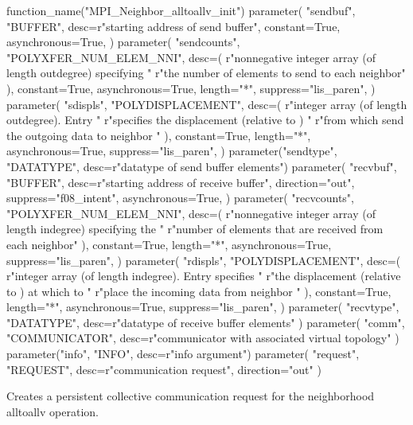 \begin{mpi-binding}
    function_name("MPI_Neighbor_alltoallv_init")
    parameter(
        "sendbuf",
        "BUFFER",
        desc=r"starting address of send buffer",
        constant=True,
        asynchronous=True,
    )
    parameter(
        "sendcounts",
        "POLYXFER_NUM_ELEM_NNI",
        desc=(
            r"nonnegative integer array (of length outdegree) specifying "
            r"the number of elements to send to each neighbor"
        ),
        constant=True,
        asynchronous=True,
        length="*",
        suppress="lis_paren",
    )
    parameter(
        "sdispls",
        "POLYDISPLACEMENT",
        desc=(
            r"integer array (of length outdegree). Entry  "
            r"specifies the displacement (relative to ) "
            r"from which send the outgoing data to neighbor "
        ),
        constant=True,
        length="*",
        asynchronous=True,
        suppress="lis_paren",
    )
    parameter("sendtype", "DATATYPE", desc=r"datatype of send buffer elements")
    parameter(
        "recvbuf",
        "BUFFER",
        desc=r"starting address of receive buffer",
        direction="out",
        suppress="f08_intent",
        asynchronous=True,
    )
    parameter(
        "recvcounts",
        "POLYXFER_NUM_ELEM_NNI",
        desc=(
            r"nonnegative integer array (of length indegree) specifying the "
            r"number of elements that are received from each neighbor"
        ),
        constant=True,
        length="*",
        asynchronous=True,
        suppress="lis_paren",
    )
    parameter(
        "rdispls",
        "POLYDISPLACEMENT",
        desc=(
            r"integer array (of length indegree). Entry  specifies "
            r"the displacement (relative to ) at which to "
            r"place the incoming data from neighbor "
        ),
        constant=True,
        length="*",
        asynchronous=True,
        suppress="lis_paren",
    )
    parameter(
        "recvtype", "DATATYPE", desc=r"datatype of receive buffer elements"
    )
    parameter(
        "comm", "COMMUNICATOR", desc=r"communicator with associated virtual topology"
    )
    parameter("info", "INFO", desc=r"info argument")
    parameter(
        "request", "REQUEST", desc=r"communication request", direction="out"
    )
\end{mpi-binding}

Creates a persistent collective communication request for the neighborhood alltoallv operation. 


